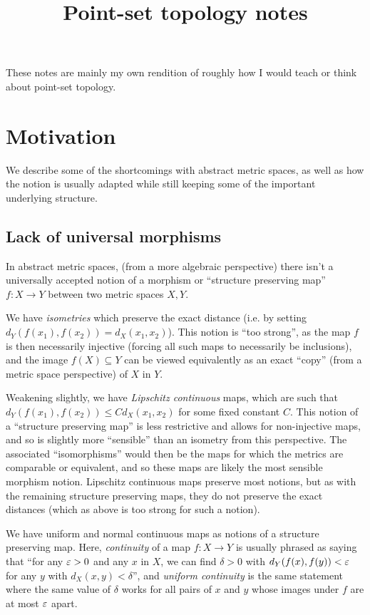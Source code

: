 \documentclass[11pt]{article}
\title{Point-set topology notes}
\begin{document}
\maketitle
These notes are mainly my own rendition of roughly how I would teach or think about point-set topology. 
\tableofcontents
\np
\section{Motivation}
We describe some of the shortcomings with abstract metric spaces, as well as how the notion is usually adapted while still keeping some of the important underlying structure.
\subsection{Lack of universal morphisms}
In abstract metric spaces, (from a more algebraic perspective) there isn't a universally accepted notion of a morphism or ``structure preserving map'' $f : X \to Y$ between two metric spaces $X, Y$.

We have \emph{isometries} which preserve the exact distance (i.e. by setting $d_Y(f(x_1), f(x_2)) = d_X(x_1, x_2)$). This notion is ``too strong'', as the map $f$ is then necessarily injective (forcing all such maps to necessarily be inclusions), and the image $f(X) \subseteq Y$ can be viewed equivalently as an exact ``copy'' (from a metric space perspective) of $X$ in $Y$.

Weakening slightly, we have \emph{Lipschitz continuous} maps, which are such that $d_Y(f(x_1), f(x_2)) \leq Cd_X(x_1, x_2)$ for some fixed constant $C$. This notion of a ``structure preserving map'' is less restrictive and allows for non-injective maps, and so is slightly more ``sensible'' than an isometry from this perspective. The associated ``isomorphisms'' would then be the maps for which the metrics are comparable or equivalent, and so these maps are likely the most sensible morphism notion. Lipschitz continuous maps preserve most notions, but as with the remaining structure preserving maps, they do not preserve the exact distances (which as above is too strong for such a notion).

We have uniform and normal continuous maps as notions of a structure preserving map. Here, \emph{continuity} of a map $f : X \to Y$ is usually phrased as saying that ``for any $\varepsilon > 0$ and any $x$ in $X$, we can find $\delta > 0$ with $d_Y(f(x), f(y)) < \varepsilon$ for any $y$ with $d_X(x, y) < \delta$'', and \emph{uniform continuity} is the same statement where the same value of $\delta$ works for all pairs of $x$ and $y$ whose images under $f$ are at most $\varepsilon$ apart. 
\end{document}
